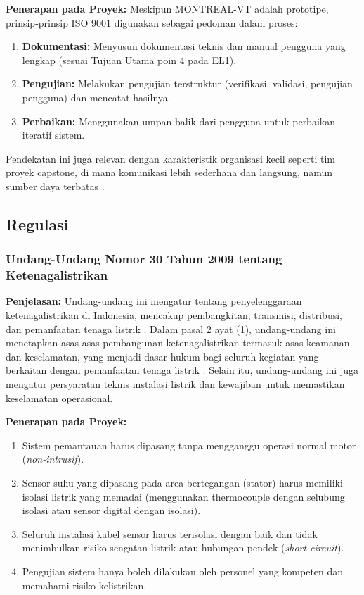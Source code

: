 \documentclass{elsinta}
\begin{document}
\textbf{Penerapan pada Proyek:} Meskipun MONTREAL-VT adalah prototipe, prinsip-prinsip ISO 9001 digunakan sebagai pedoman dalam proses:
\begin{enumerate}
    \item \textbf{Dokumentasi:} Menyusun dokumentasi teknis dan manual pengguna yang lengkap (sesuai Tujuan Utama poin 4 pada EL1).
    \item \textbf{Pengujian:} Melakukan pengujian terstruktur (verifikasi, validasi, pengujian pengguna) dan mencatat hasilnya.
    \item \textbf{Perbaikan:} Menggunakan umpan balik dari pengguna untuk perbaikan iteratif sistem.
\end{enumerate}
Pendekatan ini juga relevan dengan karakteristik organisasi kecil seperti tim proyek capstone, di mana komunikasi lebih sederhana dan langsung, namun sumber daya terbatas \cite{ISOTC1762016}.

\subsection{Regulasi}


\subsubsection{Undang-Undang Nomor 30 Tahun 2009 tentang Ketenagalistrikan}

\textbf{Penjelasan:} Undang-undang ini mengatur tentang penyelenggaraan ketenagalistrikan di Indonesia, mencakup pembangkitan, transmisi, distribusi, dan pemanfaatan tenaga listrik \cite{RepublikIndonesia2009}. Dalam pasal 2 ayat (1), undang-undang ini menetapkan asas-asas pembangunan ketenagalistrikan termasuk asas keamanan dan keselamatan, yang menjadi dasar hukum bagi seluruh kegiatan yang berkaitan dengan pemanfaatan tenaga listrik \cite{RepublikIndonesia2009}. Selain itu, undang-undang ini juga mengatur persyaratan teknis instalasi listrik dan kewajiban untuk memastikan keselamatan operasional.

\textbf{Penerapan pada Proyek:}
\begin{enumerate}
    \item Sistem pemantauan harus dipasang tanpa mengganggu operasi normal motor (\textit{non-intrusif}).
    \item Sensor suhu yang dipasang pada area bertegangan (stator) harus memiliki isolasi listrik yang memadai (menggunakan thermocouple dengan selubung isolasi atau sensor digital dengan isolasi).
    \item Seluruh instalasi kabel sensor harus terisolasi dengan baik dan tidak menimbulkan risiko sengatan listrik atau hubungan pendek (\textit{short circuit}).
    \item Pengujian sistem hanya boleh dilakukan oleh personel yang kompeten dan memahami risiko kelistrikan.
\end{enumerate}
\end{document}
